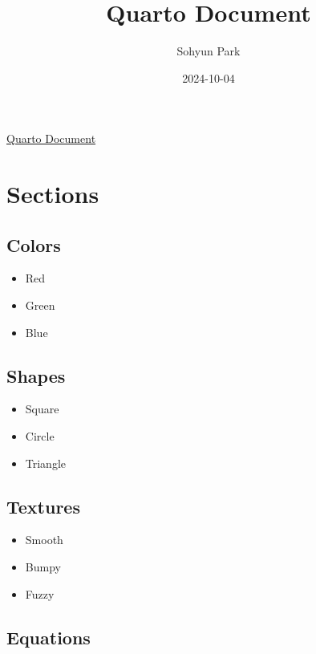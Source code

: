 \documentclass[
  letterpaper,
  DIV=11,
  numbers=noendperiod,
  oneside]{scrartcl}
\title{Quarto Document}
\author{Sohyun Park}
\date{2024-10-04}
\providecommand{\tightlist}{%
  \setlength{\itemsep}{0pt}\setlength{\parskip}{0pt}}\usepackage{longtable,booktabs,array}
\renewcommand*\contentsname{Table of contents}
\newcommand\contentsname{Table of contents}
\begin{document}
\maketitle

\renewcommand*\contentsname{Table of contents}
{
\hypersetup{linkcolor=}
\setcounter{tocdepth}{3}
\tableofcontents
}

\href{https://quarto.org/docs/get-started/authoring/vscode.html}{Quarto
Document}

\section{Sections}\label{sections}

\subsection{Colors}\label{colors}

\begin{itemize}
\tightlist
\item
  Red
\item
  Green
\item
  Blue
\end{itemize}

\subsection{Shapes}\label{shapes}

\begin{itemize}
\tightlist
\item
  Square
\item
  Circle
\item
  Triangle
\end{itemize}

\subsection{Textures}\label{textures}

\begin{itemize}
\tightlist
\item
  Smooth
\item
  Bumpy
\item
  Fuzzy
\end{itemize}

\subsection{Equations}\label{equations}
\end{document}
